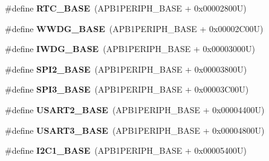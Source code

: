 \begin{DoxyCompactItemize}
\item 
\hypertarget{group___peripheral__memory__map_ga4265e665d56225412e57a61d87417022}{\#define {\bfseries R\-T\-C\-\_\-\-B\-A\-S\-E}~(A\-P\-B1\-P\-E\-R\-I\-P\-H\-\_\-\-B\-A\-S\-E + 0x00002800\-U)}\label{group___peripheral__memory__map_ga4265e665d56225412e57a61d87417022}

\item 
\hypertarget{group___peripheral__memory__map_ga9a5bf4728ab93dea5b569f5b972cbe62}{\#define {\bfseries W\-W\-D\-G\-\_\-\-B\-A\-S\-E}~(A\-P\-B1\-P\-E\-R\-I\-P\-H\-\_\-\-B\-A\-S\-E + 0x00002\-C00\-U)}\label{group___peripheral__memory__map_ga9a5bf4728ab93dea5b569f5b972cbe62}

\item 
\hypertarget{group___peripheral__memory__map_ga8543ee4997296af5536b007cd4748f55}{\#define {\bfseries I\-W\-D\-G\-\_\-\-B\-A\-S\-E}~(A\-P\-B1\-P\-E\-R\-I\-P\-H\-\_\-\-B\-A\-S\-E + 0x00003000\-U)}\label{group___peripheral__memory__map_ga8543ee4997296af5536b007cd4748f55}

\item 
\hypertarget{group___peripheral__memory__map_gac3e357b4c25106ed375fb1affab6bb86}{\#define {\bfseries S\-P\-I2\-\_\-\-B\-A\-S\-E}~(A\-P\-B1\-P\-E\-R\-I\-P\-H\-\_\-\-B\-A\-S\-E + 0x00003800\-U)}\label{group___peripheral__memory__map_gac3e357b4c25106ed375fb1affab6bb86}

\item 
\hypertarget{group___peripheral__memory__map_gae634fe8faa6922690e90fbec2fc86162}{\#define {\bfseries S\-P\-I3\-\_\-\-B\-A\-S\-E}~(A\-P\-B1\-P\-E\-R\-I\-P\-H\-\_\-\-B\-A\-S\-E + 0x00003\-C00\-U)}\label{group___peripheral__memory__map_gae634fe8faa6922690e90fbec2fc86162}

\item 
\hypertarget{group___peripheral__memory__map_gade83162a04bca0b15b39018a8e8ec090}{\#define {\bfseries U\-S\-A\-R\-T2\-\_\-\-B\-A\-S\-E}~(A\-P\-B1\-P\-E\-R\-I\-P\-H\-\_\-\-B\-A\-S\-E + 0x00004400\-U)}\label{group___peripheral__memory__map_gade83162a04bca0b15b39018a8e8ec090}

\item 
\hypertarget{group___peripheral__memory__map_gabe0d6539ac0026d598274ee7f45b0251}{\#define {\bfseries U\-S\-A\-R\-T3\-\_\-\-B\-A\-S\-E}~(A\-P\-B1\-P\-E\-R\-I\-P\-H\-\_\-\-B\-A\-S\-E + 0x00004800\-U)}\label{group___peripheral__memory__map_gabe0d6539ac0026d598274ee7f45b0251}

\item 
\hypertarget{group___peripheral__memory__map_gacd72dbffb1738ca87c838545c4eb85a3}{\#define {\bfseries I2\-C1\-\_\-\-B\-A\-S\-E}~(A\-P\-B1\-P\-E\-R\-I\-P\-H\-\_\-\-B\-A\-S\-E + 0x00005400\-U)}\label{group___peripheral__memory__map_gacd72dbffb1738ca87c838545c4eb85a3}


\end{DoxyCompactItemize}
